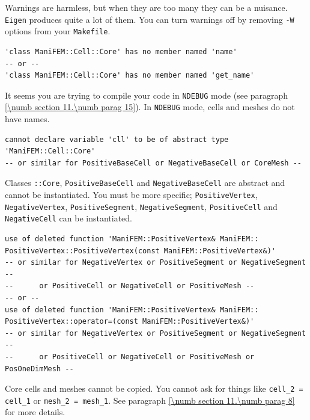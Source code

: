 Warnings are harmless, but when they are too many they can be a nuisance.
{\small\tt Eigen} produces quite a lot of them.
You can turn warnings off by removing {\small\tt -W} options from your {\small\tt Makefile}.

\begin{Verbatim}[commandchars=\\\{\},formatcom=\small\tt,baselinestretch=0.94]
'class ManiFEM::Cell::Core' has no member named 'name'
-- or --
'class ManiFEM::Cell::Core' has no member named 'get_name'
\end{Verbatim}

It seems you are trying to compile your code in {\small\tt NDEBUG} mode
(see paragraph \ref{\numb section 11.\numb parag 15}).
In {\small\tt NDEBUG} mode, cells and meshes do not have names.

\begin{Verbatim}[commandchars=\\\{\},formatcom=\small\tt,baselinestretch=0.94]
cannot declare variable 'cll' to be of abstract type 'ManiFEM::Cell::Core'
-- or similar for PositiveBaseCell or NegativeBaseCell or CoreMesh --
\end{Verbatim}

Classes {\small\tt {}::Core}, {\small\tt PositiveBaseCell} and
{\small\tt NegativeBaseCell} are abstract and cannot be instantiated.
You must be more specific; {\small\tt PositiveVertex}, {\small\tt NegativeVertex},
{\small\tt PositiveSegment}, {\small\tt NegativeSegment}, {\small\tt PositiveCell} and
{\small\tt NegativeCell} can be instantiated.

\begin{Verbatim}[commandchars=\\\{\},formatcom=\small\tt,baselinestretch=0.94]
use of deleted function 'ManiFEM::PositiveVertex& ManiFEM::
PositiveVertex::PositiveVertex(const ManiFEM::PositiveVertex&)'
-- or similar for NegativeVertex or PositiveSegment or NegativeSegment --
--      or PositiveCell or NegativeCell or PositiveMesh --
-- or --
use of deleted function 'ManiFEM::PositiveVertex& ManiFEM::
PositiveVertex::operator=(const ManiFEM::PositiveVertex&)'
-- or similar for NegativeVertex or PositiveSegment or NegativeSegment --
--      or PositiveCell or NegativeCell or PositiveMesh or PosOneDimMesh --
\end{Verbatim}

Core cells and meshes cannot be copied.
You cannot ask for things like {\small\tt cell\_2 = cell\_1} or
{\small\tt mesh\_2 = mesh\_1}.
See paragraph \ref{\numb section 11.\numb parag 8} for more details.


